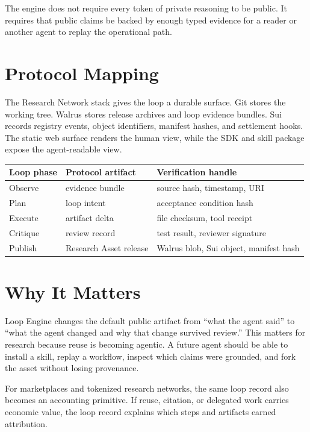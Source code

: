 \documentclass[11pt]{article}
\begin{document}
The engine does not require every token of private reasoning to be public. It requires that
public claims be backed by enough typed evidence for a reader or another agent to replay the
operational path.

\section{Protocol Mapping}

The Research Network stack gives the loop a durable surface. Git stores the working tree.
Walrus stores release archives and loop evidence bundles. Sui records registry events,
object identifiers, manifest hashes, and settlement hooks. The static web surface renders the
human view, while the SDK and skill package expose the agent-readable view.

\begin{center}
\begin{tabular}{lll}
\toprule
Loop phase & Protocol artifact & Verification handle \\
\midrule
Observe & evidence bundle & source hash, timestamp, URI \\
Plan & loop intent & acceptance condition hash \\
Execute & artifact delta & file checksum, tool receipt \\
Critique & review record & test result, reviewer signature \\
Publish & Research Asset release & Walrus blob, Sui object, manifest hash \\
\bottomrule
\end{tabular}
\end{center}

\section{Why It Matters}

Loop Engine changes the default public artifact from ``what the agent said'' to ``what the
agent changed and why that change survived review.'' This matters for research because reuse is
becoming agentic. A future agent should be able to install a skill, replay a workflow, inspect
which claims were grounded, and fork the asset without losing provenance.

For marketplaces and tokenized research networks, the same loop record also becomes an
accounting primitive. If reuse, citation, or delegated work carries economic value, the loop
record explains which steps and artifacts earned attribution.
\end{document}
